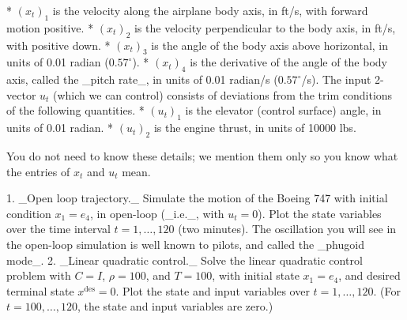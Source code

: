 * \((x_{t})_{1}\) is the velocity along the airplane body axis, in ft/s, with forward motion positive.
* \((x_{t})_{2}\) is the velocity perpendicular to the body axis, in ft/s, with positive down.
* \((x_{t})_{3}\) is the angle of the body axis above horizontal, in units of 0.01 radian (\(0.57^{\circ}\)).
* \((x_{t})_{4}\) is the derivative of the angle of the body axis, called the _pitch rate_, in units of 0.01 radian/s (\(0.57^{\circ}\)/s). The input 2-vector \(u_{t}\) (which we can control) consists of deviations from the trim conditions of the following quantities.
* \((u_{t})_{1}\) is the elevator (control surface) angle, in units of 0.01 radian.
* \((u_{t})_{2}\) is the engine thrust, in units of 10000 lbs.

You do not need to know these details; we mention them only so you know what the entries of \(x_{t}\) and \(u_{t}\) mean.

1. _Open loop trajectory._ Simulate the motion of the Boeing 747 with initial condition \(x_{1}=e_{4}\), in open-loop (_i.e._, with \(u_{t}=0\)). Plot the state variables over the time interval \(t=1,\dots,120\) (two minutes). The oscillation you will see in the open-loop simulation is well known to pilots, and called the _phugoid mode_.
2. _Linear quadratic control._ Solve the linear quadratic control problem with \(C=I\), \(\rho=100\), and \(T=100\), with initial state \(x_{1}=e_{4}\), and desired terminal state \(x^{\text{des}}=0\). Plot the state and input variables over \(t=1,\dots,120\). (For \(t=100,\dots,120\), the state and input variables are zero.) 